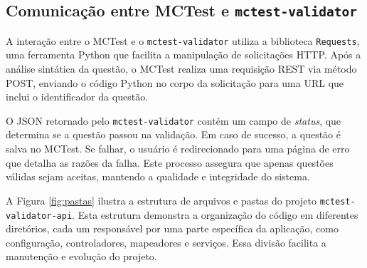 \subsection{Comunicação entre MCTest e \texttt{mctest-validator}}\label{sec:contexto}

A interação entre o MCTest e o \texttt{mctest-validator} utiliza a biblioteca \texttt{Requests}, uma ferramenta Python que facilita a manipulação de solicitações HTTP. Após a análise sintática da questão, o MCTest realiza uma requisição REST via método POST, enviando o código Python no corpo da solicitação para uma URL que inclui o identificador da questão.

O JSON retornado pelo \texttt{mctest-validator} contém um campo de \textit{status}, que determina se a questão passou na validação. Em caso de sucesso, a questão é salva no MCTest. Se falhar, o usuário é redirecionado para uma página de erro que detalha as razões da falha. Este processo assegura que apenas questões válidas sejam aceitas, mantendo a qualidade e integridade do sistema.


A Figura \ref{fig:pastas} ilustra a estrutura de arquivos e pastas do projeto \texttt{mctest-validator-api}. Esta estrutura demonstra a organização do código em diferentes diretórios, cada um responsável por uma parte específica da aplicação, como configuração, controladores, mapeadores e serviços. Essa divisão facilita a manutenção e evolução do projeto.

